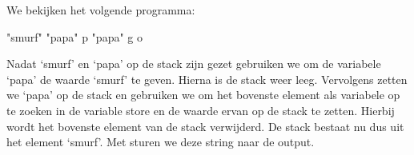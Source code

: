 \begin{exmp}
	We bekijken het volgende programma:
	\begin{smurf}"smurf" "papa" p "papa" g o\end{smurf}
	Nadat `smurf' en `papa' op de stack zijn gezet gebruiken we 
	om de variabele `papa' de waarde `smurf' te geven. Hierna is de stack weer
	leeg. Vervolgens zetten we `papa' op de stack en gebruiken we 
	om het bovenste element als variabele op te zoeken in de variable store en de
	waarde ervan op de stack te zetten. Hierbij wordt het bovenste element van de
	stack verwijderd. De stack bestaat nu dus uit het element `smurf'. Met
	 sturen we deze string naar de output.
\end{exmp}




